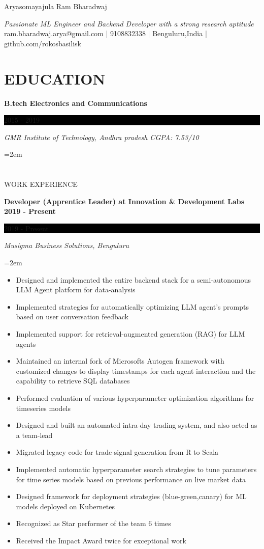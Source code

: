 \documentclass[fontsize=11pt]{article}
\newcommand{\MyName}[1]{ %
    \Huge \usefont{OT1}{phv}{b}{n} \hfill #1
    \par \normalsize \normalfont}
\newcommand{\NewPart}[1]{\section*{\uppercase{#1}}}
\newcommand{\EducationEntry}[4]{
    \noindent \textbf{#1} \hfill      %
    \colorbox{Black}{
      \parbox{8.5em}{
      \hfill\color{White}#2}} \par  %
    \noindent \textit{#3} \par        %
    \noindent\hangindent=2em\hangafter=0 \small #4 %
    \normalsize \par}
\newcommand{\WorkEntry}[4]{       %
    \noindent \textbf{#1} \hfill      %
    \colorbox{Black}{%
      \parbox{9em}{%
      \hfill\color{White}#2}} \par   %
        \noindent \textit{#3} \par        %
    \noindent\hangindent=2em\hangafter=0 \small #4 %
    \normalsize \par}
\begin{document}
    
\MyName{Aryasomayajula Ram Bharadwaj}
\bigskip
{\small \hfill \textit{Passionate ML Engineer and Backend Developer with a strong research aptitude}}
\newline \bigskip
{\small \hfill ram.bharadwaj.arya@gmail.com | 9108832338 | Benguluru,India | github.com/rokosbasilisk}


\NewPart{EDUCATION}{}
\EducationEntry
{B.tech Electronics and Communications}
{2015 - 2019}
{GMR Institute of Technology, Andhra pradesh CGPA: 7.53/10}

\NewPart{WORK EXPERIENCE}{}

\WorkEntry
{Developer (Apprentice Leader) at Innovation \& Development Labs 2019 - Present}
{2019 - Present}
{Musigma Business Solutions, Benguluru}
{\begin{itemize} \itemsep -1pt
	\item Designed and implemented the entire backend stack for a semi-autonomous LLM Agent platform for data-analysis
	\item Implemented strategies for automatically optimizing LLM agent's prompts based on user conversation feedback
	\item Implemented support for retrieval-augmented generation (RAG) for LLM agents
	\item Maintained an internal fork of Microsoft\textquotesingle{}s Autogen framework with customized changes to display timestamps for each agent interaction and the capability to retrieve SQL databases
	\item Performed evaluation of various hyperparameter optimization algorithms for timeseries models
	\item Designed and built an automated intra-day trading system, and also acted as a team-lead
	\item Migrated legacy code for trade-signal generation from R to Scala
	\item Implemented automatic hyperparameter search strategies to tune parameters for time series models based on previous performance on live market data
	\item Designed framework for deployment strategies (blue-green,canary) for ML models deployed on Kubernetes
	\item Recognized as \textquotedbl{}Star performer of the team\textquotedbl{} 6 times
	\item Received the \textquotesingle{}Impact Award\textquotesingle{} twice for exceptional work
	\end{itemize}}
\end{document}

